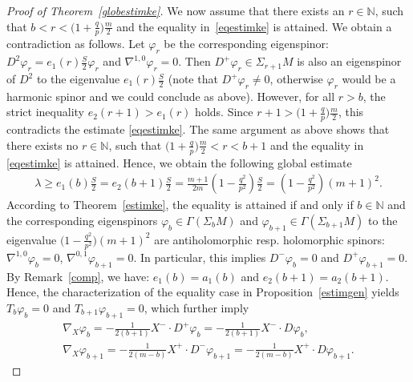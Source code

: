 \documentclass[pdftex]{sigma}
\numberwithin{equation}{section}
\theoremstyle{definition}
\begin{document}
\begin{proof}[Proof of Theorem~\ref{globestimke}]
We now assume that there exists an $r\in\mathbb{N}$, such that $b<r< \big(1+\frac{q}{p}\big)\frac{m}{2}$ and the equality in~\eqref{eqestimke} is attained. We obtain a contradiction as follows. Let $\varphi_r$ be the corresponding eigenspinor: $D^2\varphi_r=e_1(r)\frac{S}{2}\varphi_r$ and $\nabla^{1,0}\varphi_r=0$. Then $D^+\varphi_r\in\Sigma_{r+1}M$ is also an eigenspinor of $D^2$ to the eigenvalue $e_1(r)\frac{S}{2}$ (note that $D^+\varphi_r\neq 0$, otherwise $\varphi_r$ would be a harmonic spinor and we could conclude as above). However, for all $r>b$, the strict inequality $e_2(r+1)>e_1(r)$ holds. Since $r+1>\big(1+\frac{q}{p}\big)\frac{m}{2}$, this contradicts the estimate \eqref{eqestimke}. The same argument as above shows that there exists no $r\in\mathbb{N}$, such that $\big(1+\frac{q}{p}\big)\frac{m}{2}<r<b+1 $ and the equality in \eqref{eqestimke} is attained. Hence, we obtain the following global estimate
\begin{gather*}
\lambda\geq e_1(b)\frac{S}{2}=e_2(b+1)\frac{S}{2}=\frac{m+1}{2m}\left(1-\frac{q^2}{p^2}\right)\frac{S}{2}=\left(1-\frac{q^2}{p^2}\right)(m+1)^2.
\end{gather*}
According to Theorem~\ref{estimke}, the equality is attained if and only if $b \in \mathbb N$ and the corresponding eigenspinors  $\varphi_{b}\in\Gamma(\Sigma_{b} M)$ and $\varphi_{b+1}\in\Gamma(\Sigma_{b+1}M)$ to the eigenvalue $\big(1-\frac{q^2}{p^2}\big)(m+1)^2$ are antiholomorphic resp. holomorphic spinors: $\nabla^{1,0}\varphi_{b}=0$, $\nabla^{0,1}\varphi_{b+1}=0$. In particular, this implies $D^-\varphi_{b}=0$ and $D^+\varphi_{b+1}=0$. By Remark~\ref{comp}, we have: $e_1(b)=a_1(b)$ and $e_2(b+1)=a_2(b+1)$. Hence, the characterization of the equality case in Proposition~\ref{estimgen} yields $T_{b}\varphi_{b}=0$ and $T_{b+1}\varphi_{b+1}=0$, which further imply
\begin{gather}\label{twis1}
\nabla_X \varphi_{b}=-\frac{1}{2(b+1)}X^-\cdot D^+\varphi_{b}=-\frac{1}{2(b+1)}X^-\cdot D\varphi_{b},
\\
\nabla_X \varphi_{b+1}=-\frac{1}{2(m-b)}X^+\cdot D^-\varphi_{b+1}=-\frac{1}{2(m-b)}X^+\cdot D\varphi_{b+1}.\nonumber
\end{gather}


\end{proof}
\end{document}

